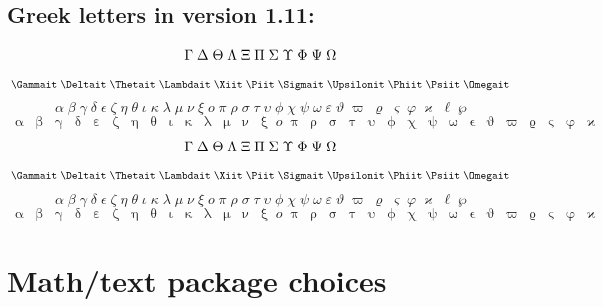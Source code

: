 \documentclass[11pt]{article}
\begin{document}
\def\testupgreekit{%
  \test\Gammait \test\Deltait 
  \test\Thetait \test\Lambdait \test\Xiit \test\Piit \test\Sigmait
  \test\Upsilonit \test\Phiit \test\Psiit \test\Omegait }
\def\testlowgreeki{%
  \test\alpha \test\beta \test\gamma \test\delta \test\epsilon
  \test\zeta \test\eta \test\theta \test\iota \test\kappa \test\lambda
  \test\mu }
\def\testlowgreekii{%
  \test\nu \test\xi \test o \test\pi \test\rho \test\sigma \test\tau
  \test\upsilon \test\phi \test\chi \test\psi \test\omega }
\def\testlowgreekiii{%
  \test\varepsilon \test\vartheta \test\varpi \test\varrho
  \test\varsigma \test\varphi \test\varkappa \test\ell \test\wp}
\def\testlowgreekiu{%
  \test\upalpha \test\upbeta \test\upgamma \test\updelta \test\upepsilon
  \test\upzeta \test\upeta \test\uptheta \test\upiota \test\upkappa \test\uplambda
  \test\upmu }
\def\testlowgreekiiu{%
  \test\upnu \test\upxi \test o \test\uppi \test\uprho \test\upsigma \test\uptau
  \test\upupsilon \test\upphi \test\upchi \test\uppsi \test\upomega }
\def\testlowgreekiiiu{%
  \test\upvarepsilon \test\upvartheta \test\upvarpi \test\upvarrho
  \test\upvarsigma \test\upvarphi \test\upvarkappa}
\def\testlowgreek{%
  \testlowgreeki\testlowgreekii\testlowgreekiii}
\def\testlowgreeku{%
  \testlowgreekiu\testlowgreekiiu\testlowgreekiiiu}
\def\test#1{\; #1}

\subsection*{Greek letters in version 1.11:} \[\testupgreek\]
\[\testupgreekit\]
\[\testlowgreek\]
\[\testlowgreeku\]
{\boldmath
\[\testupgreek\]
\[\testupgreekit\]
\[\testlowgreek\]
\[\testlowgreeku\]
}

\section{Math/text package choices}
\end{document}
